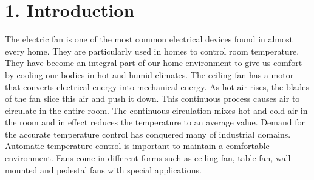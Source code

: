 \documentclass[12pt]{report}
\begin{document}
	\tableofcontents %
	
	\thispagestyle{empty} %
	
	\newpage %
	
	\vspace*{10.5cm} %
	
	
	
	
	
	
	
\setcounter{page}{1}
		\section{1. Introduction}
		The electric fan is one of the most common electrical devices found in  almost  every home.  They  are particularly  used in  homes  to control room temperature. They  have  become  an integral part of our home environment to give us comfort by cooling our bodies in hot and humid climates. The ceiling fan has a motor that converts electrical energy into mechanical energy. As hot air rises, the  blades of the  fan slice this air and  push it down. This continuous process causes air to circulate in the entire room. The continuous circulation mixes hot and cold air in the room and in effect reduces the temperature to an average value. Demand for the accurate temperature control has conquered many of industrial domains. Automatic temperature control is important to maintain a comfortable environment. Fans come in different forms such as ceiling fan, table fan, wall-mounted and pedestal fans with special applications.
		
\end{document}
